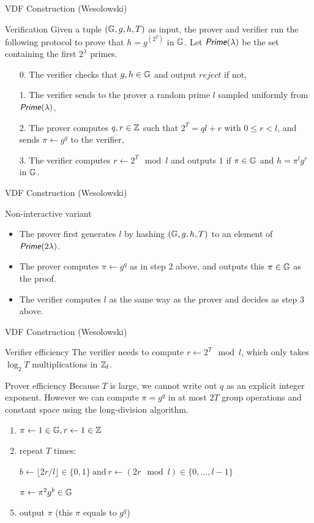 \documentclass[UTF8]{beamer}
\begin{document}
	\begin{frame}{VDF Construction (Wesolowski)}
		\begin{block}{Verification}
			Given a tuple $(\mathbb{G},g,h,T)$ as input, the prover and verifier run the following protocol to prove that $h=g^{(2^T)}$ in $\mathbb{G}$. Let $\textsf{\textit{Prime}}(\lambda)$ be the set containing the first $2^\lambda$ primes.
			\begin{enumerate}
				\item [0.] The verifier checks that $g,h\in\mathbb{G}$ and output $reject$ if not,
				\item [1.] The verifier sends to the prover a random prime $l$ sampled uniformly from $\textsf{\textit{Prime}}(\lambda)$,
				\item [2.] The prover computes $q,r\in\mathbb{Z}$ such that $2^T=ql+r$ with $0\leq r<l$, and sends $\pi\gets g^q$ to the verifier,
				\item [3.] The verifier computes $r\gets 2^T\mod l$ and outputs $1$ if $\pi\in\mathbb{G}$ and $h=\pi^lg^r$ in $\mathbb{G}$.
			\end{enumerate}
		\end{block}
	\end{frame}
	\begin{frame}{VDF Construction (Wesolowski)}
		\begin{block}{Non-interactive variant}
			\begin{itemize}
				\item The prover first generates $l$ by hashing $(\mathbb{G},g,h,T)$ to an element of $\textsf{\textit{Prime}}(2\lambda)$.
				\item The prover computes $\pi\gets g^q$ as in step $2$ above, and outputs this $\pi\in\mathbb{G}$ as the proof.
				\item The verifier computes $l$ as the same way as the prover and decides as step $3$ above.
			\end{itemize}
		\end{block}
	\end{frame}
	\begin{frame}{VDF Construction (Wesolowski)}
		\begin{block}{Verifier efficiency}
			The verifier needs to compute $r\gets 2^T\mod l$, which only takes $\log_2T$ multiplications in $\mathbb{Z}_l$.
		\end{block}
		\begin{block}{Prover efficiency}
			Because $T$ is large, we cannot write out $q$ as an explicit integer exponent. However we can compute $\pi=g^q$ in at most $2T$ group operations and constant space using the long-division algorithm.
			\begin{enumerate}
				\item $\pi\gets1\in\mathbb{G}, r\gets1\in\mathbb{Z}$
				\item repeat $T$ times:
				\item [] $b\gets\lfloor2r/l\rfloor\in\{0,1\}~\text{and}~r\gets(2r\mod l)\in\{0,\dots,l-1\}$
				\item [] $\pi\gets\pi^2g^b\in\mathbb{G}$
				\item output $\pi$ (this $\pi$ equals to $g^q$)
			\end{enumerate}
		\end{block}
	\end{frame}
\end{document}
